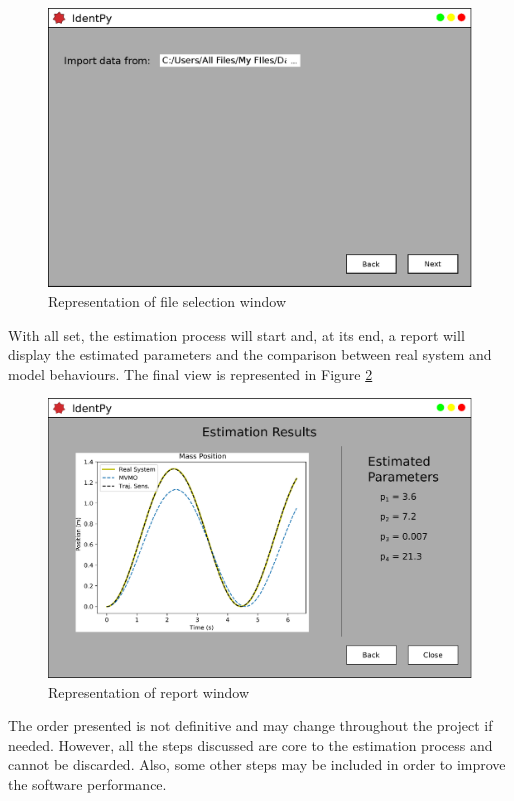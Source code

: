 \begin{figure}[h]
	\caption{Representation of file selection window}
	\begin{center}
		\includegraphics[scale=.5]{Images/Software_pg4.eps}
	\end{center}
	\label{fig: pg4}
\end{figure}

With all set, the estimation process will start and, at its end, a report will display the estimated parameters and the comparison between real system and model behaviours. The final view is represented in Figure \ref{fig: final_pg}

\begin{figure}[h]
	\caption{Representation of report window}
	\begin{center}
		\includegraphics[scale=.5]{Images/Software_final_pg.eps}
	\end{center}
	\label{fig: final_pg}
\end{figure}

The order presented is not definitive and may change throughout the project if needed. However, all the steps discussed are core to the estimation process and cannot be discarded. Also, some other steps may be included in order to improve the software performance.